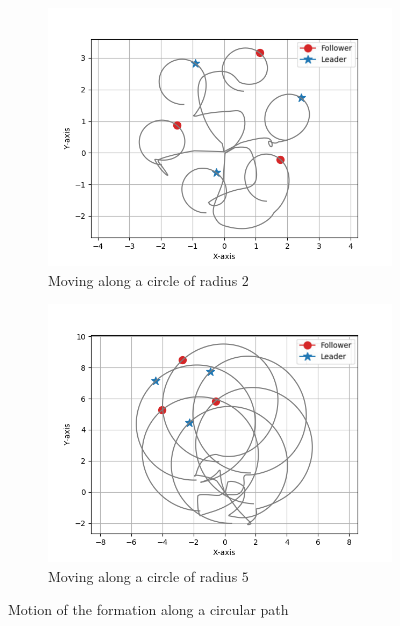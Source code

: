 \documentclass[a4paper,11pt,oneside]{book}
\begin{document}
\begin{figure}[h]
\centering
	\begin{subfigure}{0.49\textwidth}	
	\includegraphics[width=\textwidth]{Moving_hexagon_formation_circle_r_2.jpg}
	\caption{Moving along a circle of radius $2$}
	\end{subfigure}
\hfill
	\begin{subfigure}{0.49\textwidth}	
	\includegraphics[width=\textwidth]{Moving_hexagon_formation_circle_r_5.jpg}
	\caption{Moving along a circle of radius $5$}
	\end{subfigure}
\caption{Motion of the formation along a circular path}
\label{Formation_motion_circle}
\end{figure}
\end{document}
